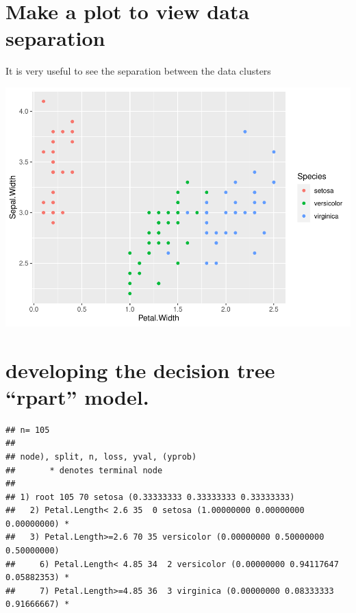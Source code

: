 \documentclass[
]{article}
\newenvironment{Shaded}{\begin{snugshade}}{\end{snugshade}}
\newcommand{\DataTypeTok}[1]{\textcolor[rgb]{0.13,0.29,0.53}{#1}}
\newcommand{\KeywordTok}[1]{\textcolor[rgb]{0.13,0.29,0.53}{\textbf{#1}}}
\newcommand{\NormalTok}[1]{#1}
\newcommand{\OperatorTok}[1]{\textcolor[rgb]{0.81,0.36,0.00}{\textbf{#1}}}
\newcommand{\StringTok}[1]{\textcolor[rgb]{0.31,0.60,0.02}{#1}}
\begin{document}
\hypertarget{make-a-plot-to-view-data-separation}{%
\section{Make a plot to view data
separation}\label{make-a-plot-to-view-data-separation}}

It is very useful to see the separation between the data clusters

\includegraphics{crtrf_files/figure-latex/unnamed-chunk-3-1.pdf}

\hypertarget{developing-the-decision-tree-rpart-model.}{%
\section{developing the decision tree ``rpart''
model.}\label{developing-the-decision-tree-rpart-model.}}

\begin{Shaded}
\end{Shaded}

\begin{verbatim}
## n= 105 
## 
## node), split, n, loss, yval, (yprob)
##       * denotes terminal node
## 
## 1) root 105 70 setosa (0.33333333 0.33333333 0.33333333)  
##   2) Petal.Length< 2.6 35  0 setosa (1.00000000 0.00000000 0.00000000) *
##   3) Petal.Length>=2.6 70 35 versicolor (0.00000000 0.50000000 0.50000000)  
##     6) Petal.Length< 4.85 34  2 versicolor (0.00000000 0.94117647 0.05882353) *
##     7) Petal.Length>=4.85 36  3 virginica (0.00000000 0.08333333 0.91666667) *
\end{verbatim}
\end{document}
